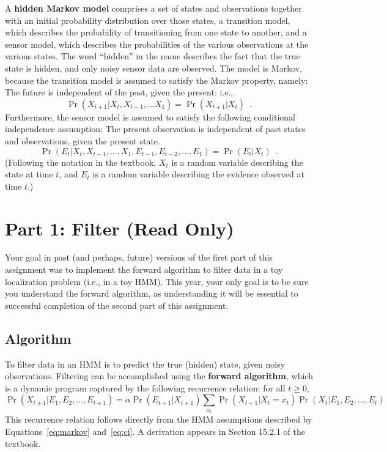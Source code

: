 \documentclass{article}
\begin{document}
A \textbf{hidden Markov model} comprises a set of states and observations together with
an initial probability distribution over those states,
a transition model, which describes the probability of transitioning from one state to another,
and a sensor model, which describes the probabilities of the various observations at the various states.
%
The word ``hidden'' in the name describes the fact that the true state is hidden,
and only noisy sensor data are observed.
The model is Markov, because the transition model is assumed to satisfy the Markov property, namely:
The future is independent of the past, given the present: i.e.,
\begin{equation}
  \Pr(X_{t + 1} | X_{t}, X_{t - 1}, \ldots X_{1}) = \Pr(X_{t + 1} | X_t) \enspace .
  \label{eq:markov}
\end{equation}
Furthermore, the sensor model is assumed to satisfy the following conditional independence assumption:
The present observation is independent of past states and observations, given the present state.
\begin{equation}
  \Pr(E_{t} | X_{t}, X_{t - 1}, \ldots, X_{1}, E_{t - 1}, E_{t - 2}, \ldots, E_{1}) = \Pr(E_{t} | X_{t}) \enspace .
  \label{eq:ci}
\end{equation}
(Following the notation in the textbook, $X_t$ is a random variable describing the state at time $t$,
and $E_t$ is a random variable describing the evidence observed at time $t$.)


\section{Part 1: Filter (Read Only)}

Your goal in past (and perhaps, future) versions of the first part
of this assignment was to implement the forward algorithm to filter
data in a toy localization problem (i.e., in a toy HMM).
This year, your only goal is to be sure you understand the forward
algorithm, as understanding it will be essential to successful
completion of the second part of this assignment.


\subsection{Algorithm}

To filter data in an HMM is to predict the true (hidden) state, given noisy observations.
Filtering can be accomplished using the \textbf{forward algorithm},
which is a dynamic program captured by the following recurrence relation:
for all $t \ge 0$,
\begin{equation}
  \Pr(X_{t + 1} | E_{1}, E_{2}, \ldots, E_{t + 1}) =
  \alpha \Pr(E_{t + 1} | X_{t + 1}) \sum_{x_t} \Pr(X_{t + 1} | X_t = x_t) \Pr(X_t | E_1, E_2, \ldots, E_t)
\end{equation}
This recurrence relation follows directly from the HMM assumptions
described by Equations~\ref{eq:markov} and~\ref{eq:ci}.
A derivation appears in Section 15.2.1 of the textbook.
\end{document}

